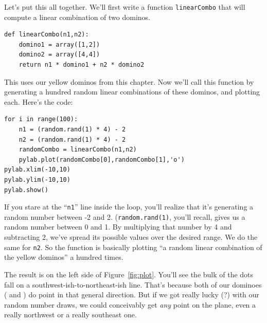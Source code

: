 Let's put this all together. We'll first write a function \texttt{linearCombo}
that will compute a linear combination of two dominos.

\begin{Verbatim}[fontsize=\small,samepage=true,frame=single,framesep=3mm]
def linearCombo(n1,n2):
    domino1 = array([1,2])
    domino2 = array([4,4])
    return n1 * domino1 + n2 * domino2
\end{Verbatim}

This uses our yellow dominos from this chapter. Now we'll call this function by
generating a hundred random linear combinations of these dominos, and plotting
each. Here's the code:

\begin{Verbatim}[fontsize=\small,samepage=true,frame=single,framesep=3mm]
for i in range(100):
    n1 = (random.rand(1) * 4) - 2
    n2 = (random.rand(1) * 4) - 2
    randomCombo = linearCombo(n1,n2)
    pylab.plot(randomCombo[0],randomCombo[1],'o')
pylab.xlim(-10,10)
pylab.ylim(-10,10)
pylab.show()
\end{Verbatim}

If you stare at the ``\texttt{n1}'' line inside the loop, you'll realize that
it's generating a random number between -2 and 2. (\texttt{random.rand(1)},
you'll recall, gives us a random number between 0 and 1. By multiplying that
number by 4 and subtracting 2, we've spread its possible values over the
desired range. We do the same for \texttt{n2}. So the function is basically
plotting ``a random linear combination of the yellow dominos'' a hundred times.

The result is on the left side of Figure~\ref{fig:plot}. You'll see the bulk of
the dots fall on a southwest-ish-to-northeast-ish line. That's because both
of our dominoes (
and
 )
do point in that general direction. But if we got really lucky (?) with our
random number draws, we could conceivably get \textit{any} point on the plane,
even a really northwest or a really southeast one.

